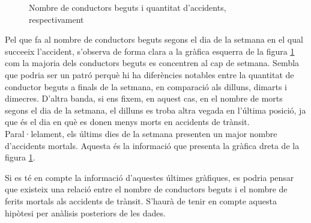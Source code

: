 \documentclass[12pt,longbibliography]{article}
\theoremstyle{definition}
\theoremstyle{remark}
\begin{document}
\begin{figure}[h!]
\par
{}%
\hfill
{}%
\par

\caption{Nombre de conductors beguts i quantitat d'accidents, respectivament}
\label{fig:G1}
\end{figure}

Pel que fa al nombre de conductors beguts segons el dia de la setmana en el qual succeeix l'accident, s'observa de forma clara a la gràfica esquerra de la figura  \ref{fig:G1} com la majoria dels conductors beguts es concentren al cap de setmana. Sembla que podria ser un patró perquè hi ha diferències notables entre la quantitat de conductor beguts a finals de la setmana, en comparació als dilluns, dimarts i dimecres. D'altra banda, si ens fixem, en aquest cas, en el nombre de morts segons el dia de la setmana, el dilluns es troba altra vegada en l'última posició, ja que és el dia en què es donen menys morts en accidents de trànsit. Paral·lelament, els últims dies de la setmana presenten un major nombre d'accidents mortals. Aquesta és la informació que presenta la gràfica dreta de la figura \ref{fig:G1}.


Si es té en compte la informació d'aquestes últimes gràfiques, es podria pensar que existeix una relació entre el nombre de conductors beguts i el nombre de ferits mortals als accidents de trànsit. S'haurà de tenir en compte aquesta hipòtesi per anàlisis posteriors de les dades.
\end{document}
